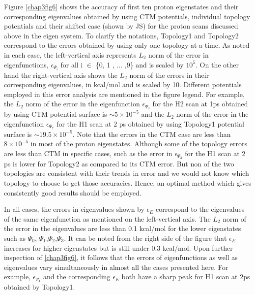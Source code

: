 Figure \ref{chap3fig6} shows the accuracy of first ten proton eigenstates and their corresponding eigenvalues
obtained by using CTM potentials, individual topology potentials and their shifted case (shown by JS) for the
proton
scans discussed above in the eigen system. To clarify the notations, Topology1 and Topology2 correspond
to the errors obtained by using only one topology at a time. As noted in each case, the left-vertical axis represents
$L_{2}$ norm of the error in eigenfunctions, $\epsilon_{\Psi_{i}}$ for all i $\in$ \{0, 1 , ... ,9\} and is scaled
by $10^5$. On the other hand the right-vertical axis shows the $L_{2}$ norm of the errors in their corresponding
eigenvalues, in kcal/mol and is scaled by 10. Different potentials employed in this error analysis are mentioned in
the figure legend. For example, the $L_{2}$ norm of the error in the eigenfunction $\epsilon_{\Psi_{0}}$ for the H2
scan at 1ps obtained by using CTM potential surface is $\sim 5\times10^{-5}$ and the $L_{2}$ norm of the error in the
eigenfunction $\epsilon_{\Psi_{7}}$ for the H1 scan at 2 ps obtained by using Topology1 potential surface is
$\sim 19.5 \times10^{-5}$. Note that the errors in the CTM case are less than $8\times10^{-5}$ in most of the proton
eigenstates. Although some of the topology errors are less than CTM in specific cases, such as the error in
$\epsilon_{\Psi_{3}}$ for the H1 scan at 2 ps is lower for Topology2 as compared to its CTM error. But non of the two
topologies are consistent with their trends in error and we would not know which topology to choose to get those
accuracies. Hence, an optimal method which gives consistently good results should be employed.

In all cases, the errors in eigenvalues shown by $\epsilon_{E}$ correspond to the eigenvalues of the same
eigenfunction as mentioned on the left-vertical axis. The $L_{2}$ norm of the error in the eigenvalues are
less than 0.1 kcal/mol for the lower eigenstates such as $\Psi_{0}$, $\Psi_{1}$,$\Psi_{2}$,$\Psi_{3}$. It
can be noted from the right side of the figure that $\epsilon_{E}$ increases for higher eigenstates but is
still under 0.3 kcal/mol. Upon further inspection of \ref{chap3fig6}, it follows that the errors of eigenfunctions
as well as eigenvalues vary simultaneously in almost all the cases presented here. For example, $\epsilon_{\Psi_{4}}$
and the corresponding $\epsilon_{E}$ both have a sharp peak for H1 scan at 2ps obtained by Topology1.

